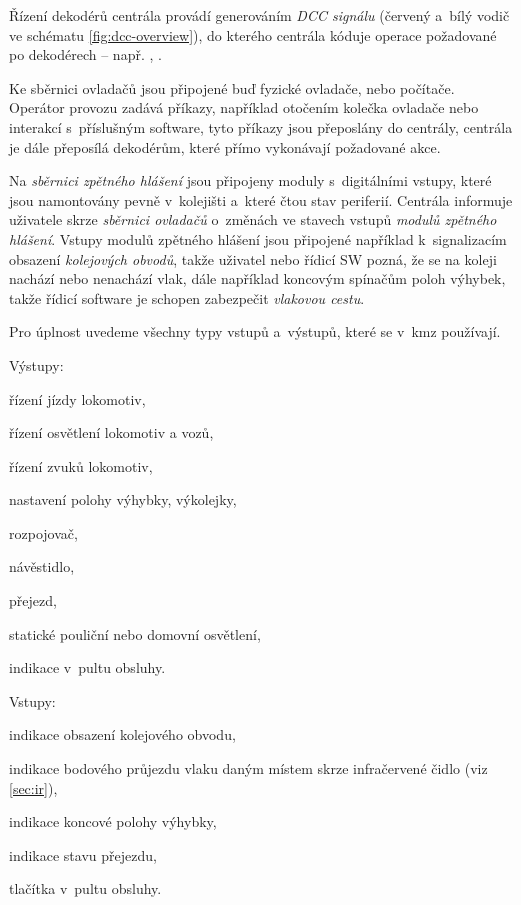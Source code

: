 Řízení dekodérů centrála provádí generováním \textit{DCC signálu} (červený
a~bílý vodič ve schématu \ref{fig:dcc-overview}), do kterého centrála kóduje
operace požadované po dekodérech – např. , .

Ke sběrnici ovladačů jsou připojené buď fyzické ovladače, nebo počítače.
Operátor provozu zadává příkazy, například otočením kolečka ovladače nebo
interakcí s~příslušným software, tyto příkazy jsou přeposlány do centrály,
centrála je dále přeposílá dekodérům, které přímo vykonávají požadované akce.

Na \textit{sběrnici zpětného hlášení} jsou připojeny moduly s~digitálními vstupy,
které jsou namontovány pevně v~kolejišti a~které čtou stav periferií.
Centrála informuje uživatele skrze \textit{sběrnici ovladačů} o~změnách ve
stavech vstupů \textit{modulů zpětného hlášení}. Vstupy modulů zpětného hlášení
jsou připojené například k~signalizacím obsazení \textit{kolejových obvodů},
takže uživatel nebo řídicí SW pozná, že se na koleji nachází nebo nenachází
vlak, dále například koncovým spínačům poloh výhybek, takže řídicí software je
schopen zabezpečit \textit{vlakovou cestu}.

Pro úplnost uvedeme všechny typy vstupů a~výstupů, které se v~\gls{kmz}
používají.

Výstupy:

\begin{compactitem}
\item řízení jízdy lokomotiv,
\item řízení osvětlení lokomotiv a vozů,
\item řízení zvuků lokomotiv,
\item nastavení polohy výhybky, výkolejky,
\item rozpojovač,
\item návěstidlo,
\item přejezd,
\item statické pouliční nebo domovní osvětlení,
\item indikace v~pultu obsluhy.
\end{compactitem}

Vstupy:

\begin{compactitem}
\item indikace obsazení kolejového obvodu,
\item indikace bodového průjezdu vlaku daným místem skrze infračervené čidlo
	(viz \ref{sec:ir}),
\item indikace koncové polohy výhybky,
\item indikace stavu přejezdu,
\item tlačítka v~pultu obsluhy.
\end{compactitem}

